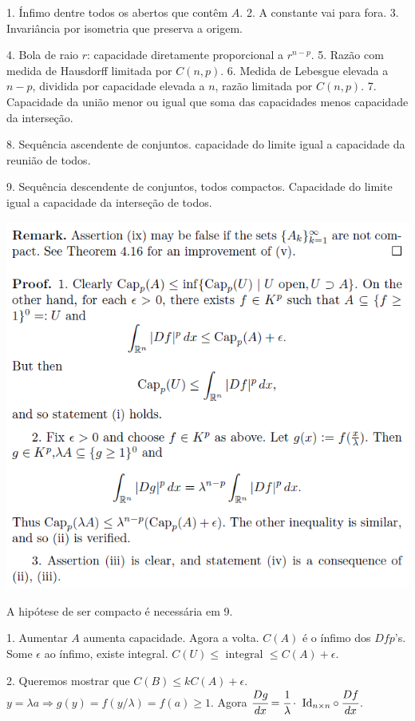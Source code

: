 \documentclass[12pt]{article}
\begin{document}
1. \'Infimo dentre todos os abertos que cont\^em $A$. 2. A constante vai para fora. 3. Invari\^ancia por isometria que preserva a origem.

4. Bola de raio $r$: capacidade diretamente proporcional a $r^{n - p}$. 5. Raz\~ao com medida de Hausdorff limitada por $C(n,p)$. 6. Medida de Lebesgue elevada a $n-p$, dividida por capacidade elevada a $n$, raz\~ao limitada por $C(n, p)$. 7. Capacidade da uni\~ao menor ou igual que soma das capacidades menos capacidade da interse\c{c}\~ao.

8. Sequ\^encia ascendente de conjuntos. capacidade do limite igual a capacidade da reuni\~ao de todos.

9. Sequ\^encia descendente de conjuntos, todos compactos. Capacidade do limite igual a capacidade da interse\c{c}\~ao de todos.

\vspace{300mm}

		\begin{center}
		\includegraphics[scale=.85]{11}
		\end{center}

A hip\'otese de ser compacto \'e necess\'aria em 9.

1. Aumentar $A$ aumenta capacidade. Agora a volta. $C(A)$ \'e o \'infimo dos $Dfp$'s. Some $\epsilon$ ao \'infimo, existe integral. $C(U) \le \text{ integral }\le C(A) + \epsilon$.

2. Queremos mostrar que $C(B) \le k C(A) + \epsilon$. $y = \lambda a \Rightarrow g(y) = f(y/\lambda) = f(a) \ge 1$. Agora $\cfrac{Dg}{dx} = \cfrac{1}{\lambda}\cdot\text{ Id}_{n\times n} \circ \cfrac{Df}{dx}$.
\end{document}
